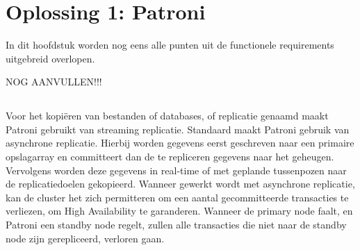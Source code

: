 
\chapter{Oplossing 1: Patroni}
\label{ch:Oplossing 1: Patroni}

In dit hoofdstuk worden nog eens alle punten uit de functionele requirements uitgebreid overlopen.

NOG AANVULLEN!!!


\section{}
\label{sec:Redundantie/Replicatie}

Voor het kopiëren van bestanden of databases, of replicatie genaamd maakt Patroni gebruikt van streaming replicatie. Standaard maakt Patroni gebruik van asynchrone replicatie. Hierbij worden gegevens eerst geschreven naar een primaire opslagarray en committeert dan de te repliceren gegevens naar het geheugen. Vervolgens worden deze gegevens in real-time of met geplande tussenpozen naar de replicatiedoelen gekopieerd.
Wanneer gewerkt wordt met asynchrone replicatie, kan de cluster het zich permitteren om een aantal gecommitteerde transacties te verliezen, om High Availability te garanderen. Wanneer de primary node faalt, en Patroni een standby node regelt, zullen alle transacties die niet naar de standby node zijn gerepliceerd, verloren gaan.



\section{}
\label{sec:Failover}

\section{}
\label{sec:Monitoring}







